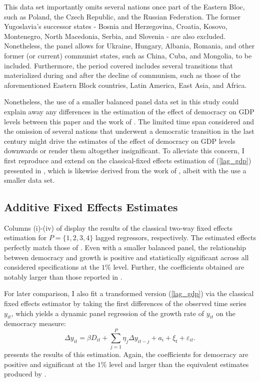 This data set importantly omits several nations once part of the Eastern Bloc, such as Poland, the Czech Republic, and the Russian Federation. The former Yugoslavia's successor states - Bosnia and Herzegovina, Croatia, Kosovo, Montenegro, North Macedonia, Serbia, and Slovenia - are also excluded. Nonetheless, the panel allows for Ukraine, Hungary, Albania, Romania, and other former (or current) communist states, such as China, Cuba, and Mongolia, to be included. Furthermore, the period covered includes several transitions that materialized during and after the decline of communism, such as those of the aforementioned Eastern Block countries, Latin America, East Asia, and Africa.

Nonetheless, the use of a smaller balanced panel data set in this study could explain away any differences in the estimation of the effect of democracy on \ac{GDP} levels between this paper and the work of \citet{acemoglu2019democracy}. The limited time span considered and the omission of several nations that underwent a democratic transition in the last century might drive the estimates of the effect of democracy on \ac{GDP} levels downwards or render them altogether insignificant. To alleviate this concern, I first reproduce and extend on the classical-fixed effects estimation of (\ref{lag_gdp}) presented in \citet{chen2019mastering}, which is likewise derived from the work of \citet{acemoglu2019democracy}, albeit with the use a smaller data set. 



\subsection{Additive Fixed Effects Estimates}

Columns (i)-(iv) of  display the results of the classical two-way fixed effects estimation for $P = \{1,2,3,4\}$ lagged regressors, respectively. The estimated effects perfectly match those of \citet{chen2019mastering}. Even with a smaller balanced panel, the relationship between democracy and growth is positive and statistically significant across all considered specifications at the $1\%$ level. Further, the coefficients obtained are notably larger than those reported in \citet{acemoglu2019democracy}.  

For later comparison, I also fit a transformed version (\ref{lag_gdp}) via the classical fixed effects estimator by taking the first differences of the observed time series $y_{it}$, which yields a dynamic panel regression of the growth rate of $y_{it}$ on the democracy measure:
\begin{equation}\label{diff_lag_gdp}
\Delta y_{it} = \beta D_{it} + \sum_{j=1}^P \eta_j \Delta y_{it-j} + a_i + \xi_t +  \varepsilon_{it}.
\end{equation}
 presents the results of this estimation. Again, the coefficients for democracy are positive and significant at the $1\%$ level and larger than the equivalent estimates produced by \citet{acemoglu2019democracy}.


